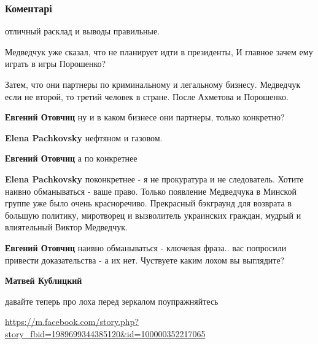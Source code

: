  
 
 
 
 
\subsubsection{Коментарі}

\begin{itemize} %
отличный расклад и выводы правильные.

Медведчук уже сказал, что не планирует идти в президенты, И главное зачем ему играть в игры Порошенко?

\begin{itemize} %
Затем, что они партнеры по криминальному и легальному бизнесу. Медведчук если не второй, то третий человек в стране. После Ахметова и Порошенко.

\textbf{Евгений Отовчиц} ну и в каком бизнесе они партнеры, только конкретно?

\textbf{Elena Pachkovsky} нефтяном и газовом.

\textbf{Евгений Отовчиц} а по конкретнее

\textbf{Elena Pachkovsky} поконкретнее - я не прокуратура и не следователь. Хотите наивно обманываться - ваше право. Только появление Медведчука в Минской группе уже было очень красноречиво. Прекрасный бэкграунд для возврата в большую политику, миротворец и вызволитель украинских граждан, мудрый и влиятельный Виктор Медведчук.

\textbf{Евгений Отовчиц} наивно обманываться - ключевая фраза.. вас попросили привести доказательства - а их нет. Чуствуете каким лохом вы выглядите?

\textbf{Матвей Кублицкий} 

давайте теперь про лоха перед зеркалом поупражняйтесь

\url{https://m.facebook.com/story.php?story_fbid=1989699344385120&id=100000352217065}
\end{itemize} %



\end{itemize}
